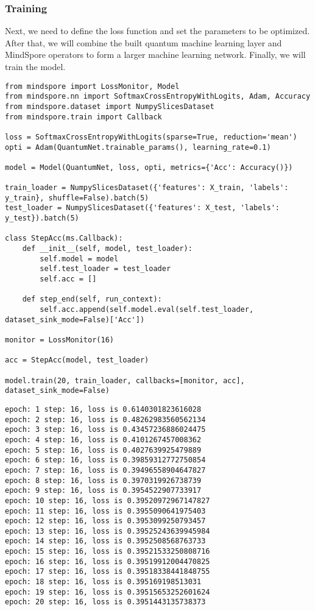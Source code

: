 \subsubsection{Training}
Next, we need to define the loss function and set the parameters to be optimized. After that, we will combine the built quantum machine learning layer and MindSpore operators to form a larger machine learning network. Finally, we will train the model. %

\begin{lstlisting}
from mindspore import LossMonitor, Model
from mindspore.nn import SoftmaxCrossEntropyWithLogits, Adam, Accuracy
from mindspore.dataset import NumpySlicesDataset
from mindspore.train import Callback

loss = SoftmaxCrossEntropyWithLogits(sparse=True, reduction='mean')
opti = Adam(QuantumNet.trainable_params(), learning_rate=0.1)

model = Model(QuantumNet, loss, opti, metrics={'Acc': Accuracy()})

train_loader = NumpySlicesDataset({'features': X_train, 'labels': y_train}, shuffle=False).batch(5)
test_loader = NumpySlicesDataset({'features': X_test, 'labels': y_test}).batch(5)

class StepAcc(ms.Callback):
    def __init__(self, model, test_loader):
        self.model = model
        self.test_loader = test_loader
        self.acc = []

    def step_end(self, run_context):
        self.acc.append(self.model.eval(self.test_loader, dataset_sink_mode=False)['Acc'])

monitor = LossMonitor(16)

acc = StepAcc(model, test_loader)

model.train(20, train_loader, callbacks=[monitor, acc], dataset_sink_mode=False)
\end{lstlisting}

\begin{lstlisting}
epoch: 1 step: 16, loss is 0.6140301823616028
epoch: 2 step: 16, loss is 0.48262983560562134
epoch: 3 step: 16, loss is 0.43457236886024475
epoch: 4 step: 16, loss is 0.4101267457008362
epoch: 5 step: 16, loss is 0.4027639925479889
epoch: 6 step: 16, loss is 0.39859312772750854
epoch: 7 step: 16, loss is 0.39496558904647827
epoch: 8 step: 16, loss is 0.3970319926738739
epoch: 9 step: 16, loss is 0.3954522907733917
epoch: 10 step: 16, loss is 0.39520972967147827
epoch: 11 step: 16, loss is 0.3955090641975403
epoch: 12 step: 16, loss is 0.3953099250793457
epoch: 13 step: 16, loss is 0.39525243639945984
epoch: 14 step: 16, loss is 0.3952508568763733
epoch: 15 step: 16, loss is 0.39521533250808716
epoch: 16 step: 16, loss is 0.39519912004470825
epoch: 17 step: 16, loss is 0.39518338441848755
epoch: 18 step: 16, loss is 0.395169198513031
epoch: 19 step: 16, loss is 0.39515653252601624
epoch: 20 step: 16, loss is 0.3951443135738373
\end{lstlisting}

